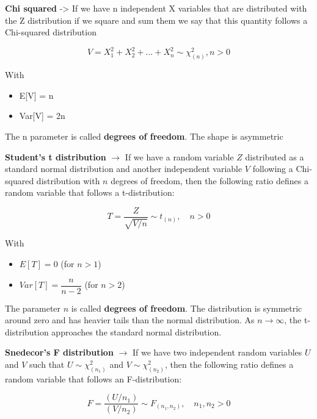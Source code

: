 \textbf{Chi squared} -> If we have n independent X variables that are distributed with the Z distribution if we square and sum them we say that this quantity follows a Chi-squared distribution

\begin{equation}
    V=X_1^2+X_2^2+...+X_n^2 \sim\chi_{(n)}^2, n>0
\end{equation}

With
\begin{itemize}
    \item E[V] = n
    \item Var[V] = 2n
\end{itemize}

The n parameter is called \textbf{degrees of freedom}. The shape is asymmetric

\vspace{10pt}


\textbf{Student’s t distribution} $\rightarrow$  
If we have a random variable $Z$ distributed as a standard normal distribution and another independent variable $V$ following a Chi-squared distribution with $n$ degrees of freedom, then the following ratio defines a random variable that follows a t-distribution:

\begin{equation}
    T = \frac{Z}{\sqrt{V / n}} \sim t_{(n)}, \quad n > 0
\end{equation}

With
\begin{itemize}
    \item $E[T] = 0$ \quad (for $n > 1$)
    \item $Var[T] = \dfrac{n}{n - 2}$ \quad (for $n > 2$)
\end{itemize}

The parameter $n$ is called \textbf{degrees of freedom}.  
The distribution is symmetric around zero and has heavier tails than the normal distribution.  
As $n \to \infty$, the t-distribution approaches the standard normal distribution.

\vspace{10pt}


\textbf{Snedecor’s F distribution} $\rightarrow$  
If we have two independent random variables $U$ and $V$ such that  
$U \sim \chi^2_{(n_1)}$ and $V \sim \chi^2_{(n_2)}$,  
then the following ratio defines a random variable that follows an F-distribution:

\begin{equation}
    F = \frac{(U / n_1)}{(V / n_2)} \sim F_{(n_1, n_2)}, \quad n_1, n_2 > 0
\end{equation}

